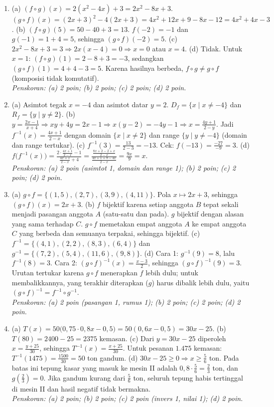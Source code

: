 \documentclass[a4paper,11pt]{article}
\newcommand{\dis}{\displaystyle}
\begin{document}
\small\begin{enumerate}[leftmargin=2em,itemsep=3pt,topsep=2pt]
\item[\textbf{1.}] (a) $(f\circ g)(x)=2(x^2-4x)+3=2x^2-8x+3$. $(g\circ f)(x)=(2x+3)^2-4(2x+3)=4x^2+12x+9-8x-12=4x^2+4x-3$. (b) $(f\circ g)(5)=50-40+3=13$. $f(-2)=-1$ dan $g(-1)=1+4=5$, sehingga $(g\circ f)(-2)=5$. (c) $2x^2-8x+3=3\Rightarrow2x(x-4)=0\Rightarrow x=0$ atau $x=4$. (d) Tidak. Untuk $x=1$: $(f\circ g)(1)=2-8+3=-3$, sedangkan $(g\circ f)(1)=4+4-3=5$. Karena hasilnya berbeda, $f\circ g\neq g\circ f$ (komposisi tidak komutatif). \\ \textit{Penskoran: (a) 2 poin; (b) 2 poin; (c) 2 poin; (d) 2 poin.}
\item[\textbf{2.}] (a) Asimtot tegak $x=-4$ dan asimtot datar $y=2$. $D_f=\{x\mid x\neq-4\}$ dan $R_f=\{y\mid y\neq2\}$. (b) $y=\dis\frac{2x-1}{x+4}\Rightarrow xy+4y=2x-1\Rightarrow x(y-2)=-4y-1\Rightarrow x=\dis\frac{4y+1}{2-y}$. Jadi $f^{-1}(x)=\dis\frac{4x+1}{2-x}$ dengan domain $\{x\mid x\neq2\}$ dan range $\{y\mid y\neq-4\}$ (domain dan range tertukar). (c) $f^{-1}(3)=\dis\frac{13}{2-3}=-13$. Cek: $f(-13)=\dis\frac{-27}{-9}=3$. (d) $f\big(f^{-1}(x)\big)=\dis\frac{2\cdot\frac{4x+1}{2-x}-1}{\frac{4x+1}{2-x}+4}=\dis\frac{\frac{8x+2-2+x}{2-x}}{\frac{4x+1+8-4x}{2-x}}=\dis\frac{9x}{9}=x$. \\ \textit{Penskoran: (a) 2 poin (asimtot 1, domain dan range 1); (b) 2 poin; (c) 2 poin; (d) 2 poin.}
\item[\textbf{3.}] (a) $g\circ f=\{(1,5),(2,7),(3,9),(4,11)\}$. Pola $x\mapsto2x+3$, sehingga $(g\circ f)(x)=2x+3$. (b) $f$ bijektif karena setiap anggota $B$ tepat sekali menjadi pasangan anggota $A$ (satu-satu dan pada). $g$ bijektif dengan alasan yang sama terhadap $C$. $g\circ f$ memetakan empat anggota $A$ ke empat anggota $C$ yang berbeda dan semuanya terpakai, sehingga bijektif. (c) $f^{-1}=\{(4,1),(2,2),(8,3),(6,4)\}$ dan $g^{-1}=\{(7,2),(5,4),(11,6),(9,8)\}$. (d) Cara 1: $g^{-1}(9)=8$, lalu $f^{-1}(8)=3$. Cara 2: $(g\circ f)^{-1}(x)=\dis\frac{x-3}{2}$, sehingga $(g\circ f)^{-1}(9)=3$. Urutan tertukar karena $g\circ f$ menerapkan $f$ lebih dulu; untuk membalikkannya, yang terakhir diterapkan ($g$) harus dibalik lebih dulu, yaitu $(g\circ f)^{-1}=f^{-1}\circ g^{-1}$. \\ \textit{Penskoran: (a) 2 poin (pasangan 1, rumus 1); (b) 2 poin; (c) 2 poin; (d) 2 poin.}
\item[\textbf{4.}] (a) $T(x)=50\big(0{,}75\cdot0{,}8x-0{,}5\big)=50(0{,}6x-0{,}5)=30x-25$. (b) $T(80)=2400-25=2375$ kemasan. (c) Dari $y=30x-25$ diperoleh $x=\dis\frac{y+25}{30}$, sehingga $T^{-1}(x)=\dis\frac{x+25}{30}$. Untuk pesanan $1.475$ kemasan: $T^{-1}(1475)=\dis\frac{1500}{30}=50$ ton gandum. (d) $30x-25\ge0\Rightarrow x\ge\dis\frac56$ ton. Pada batas ini tepung kasar yang masuk ke mesin II adalah $0{,}8\cdot\dis\frac56=\dis\frac23$ ton, dan $g\!\left(\dis\frac23\right)=0$. Jika gandum kurang dari $\dis\frac56$ ton, seluruh tepung habis tertinggal di mesin II dan hasil negatif tidak bermakna. \\ \textit{Penskoran: (a) 2 poin; (b) 2 poin; (c) 2 poin (invers 1, nilai 1); (d) 2 poin.}

\end{enumerate}
\end{document}
